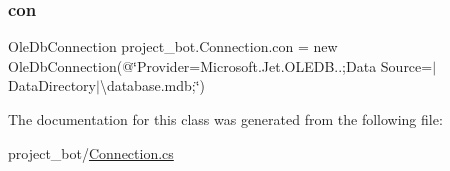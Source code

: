 \subsubsection{\texorpdfstring{con}{con}}
{\footnotesize\ttfamily Ole\+Db\+Connection project\+\_\+bot.\+Connection.\+con = new Ole\+Db\+Connection(@\char`\"{}Provider=Microsoft.\+Jet.\+O\+L\+E\+D\+B..;Data Source=$\vert$Data\+Directory$\vert$\textbackslash{}database.\+mdb;\char`\"{})\hspace{0.3cm}{\ttfamily [private]}}



The documentation for this class was generated from the following file\+:\begin{DoxyCompactItemize}
\item 
project\+\_\+bot/\hyperlink{_connection_8cs}{Connection.\+cs}\end{DoxyCompactItemize}
